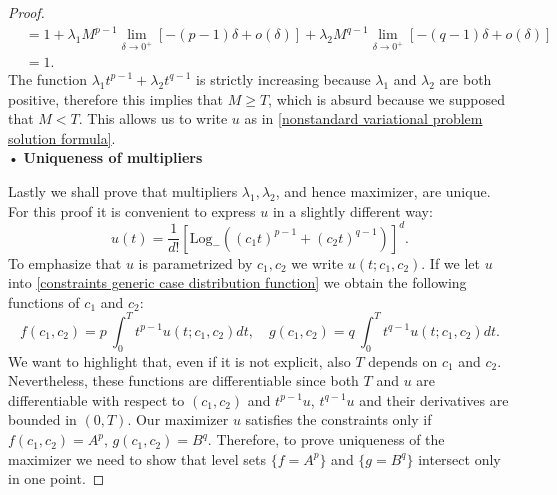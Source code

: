 \documentclass[corpo=11pt, stile=classica, tipotesi=custom,
greek, evenboxes, english]{toptesi}
\numberwithin{equation}{chapter}
\theoremstyle{definition}
\theoremstyle{remark}
\newcommand{\Log}{\ensuremath{\mathrm{Log}_-}}
\begin{document}
\begin{proof}
\begin{align*}
										  &= 1 + \lambda_1 M^{p-1} \lim_{\delta \rightarrow 0^+} \left[ -(p-1)\delta + o(\delta) \right] + \lambda_2 M^{q-1} \lim_{\delta \rightarrow 0^+} \left[ -(q-1)\delta + o(\delta) \right]\\
										  &= 1.
\end{align*}
The function $\lambda_1 t^{p-1}  + \lambda_2 t^{q-1}$ is strictly increasing because $\lambda_1$ and $\lambda_2$ are both positive, therefore this implies that $M \geq T$, which is absurd because we supposed that $M<T$. This allows us to write $u$ as in \eqref{nonstandard variational problem solution formula}.\\
• \textbf{Uniqueness of multipliers}

Lastly we shall prove that multipliers $\lambda_1, \lambda_2$, and hence maximizer, are unique. For this proof it is convenient to express $u$ in a slightly different way:
\begin{equation*}
	u(t) = \dfrac{1}{d!}\left[ \Log\left((c_1t)^{p-1} + (c_2t)^{q-1}\right) \right]^d.
\end{equation*} 
To emphasize that $u$ is parametrized by $c_1, c_2$ we write $u(t;c_1,c_2)$. If we let $u$ into \eqref{constraints generic case distribution function} we obtain the following functions of $c_1$ and $c_2$:
\begin{equation*}
	f(c_1,c_2) = p\ \int_0^T t^{p-1}u(t;c_1,c_2)dt, \quad g(c_1,c_2) = q\ \int_0^T t^{q-1}u(t;c_1,c_2)dt.
\end{equation*}
We want to highlight that, even if it is not explicit, also $T$ depends on $c_1$ and $c_2$. Nevertheless, these functions are differentiable since both $T$ and $u$ are differentiable with respect to $(c_1,c_2)$ and $t^{p-1}u$, $t^{q-1}u$ and their derivatives are bounded in $(0,T)$. 
Our maximizer $u$ satisfies the constraints only if $f(c_1,c_2)=A^p, \, g(c_1,c_2) = B^q$. Therefore, to prove uniqueness of the maximizer we need to show that level sets $\{f=A^p\}$ and $\{g=B^q\}$ intersect only in one point.


\end{proof}
\end{document}
